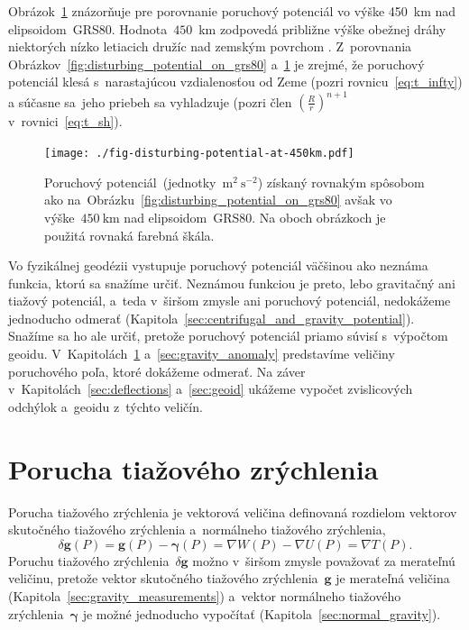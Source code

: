 \documentclass[a4paper,12pt]{book}
\let\vec\mathbf
\begin{document}
Obrázok~\ref{fig:disturbing_potential_at_450km} znázorňuje pre porovnanie 
poruchový potenciál vo výške 450~km nad elipsoidom~GRS80.  Hodnota~$450$~km 
zodpovedá približne výške obežnej dráhy niektorých nízko letiacich družíc nad 
zemským povrchom \parencite[pozri napríklad][]{MoritzPhysicalGeodesy}.  
Z~porovnania Obrázkov~\ref{fig:disturbing_potential_on_grs80} 
a~\ref{fig:disturbing_potential_at_450km} je zrejmé, že poruchový potenciál 
klesá s~narastajúcou vzdialenosťou od Zeme (pozri rovnicu~\ref{eq:t_infty}) 
a súčasne sa~jeho priebeh sa vyhladzuje (pozri člen $\left( \frac{R}{r} 
\right)^{n + 1}$ v~rovnici~\ref{eq:t_sh}).

\begin{figure}
\centering
\texttt{[image: ./fig-disturbing-potential-at-450km.pdf]}
\caption{Poruchový potenciál~(jednotky~$\mathrm{m}^2 \ \mathrm{s}^{-2}$) 
získaný rovnakým spôsobom ako 
na~Obrázku~\ref{fig:disturbing_potential_on_grs80} avšak vo výške~$450\ 
\mathrm{km}$ nad elipsoidom~GRS80.  Na oboch obrázkoch je použitá rovnaká 
farebná škála.}
\label{fig:disturbing_potential_at_450km}
\end{figure}

Vo fyzikálnej geodézii vystupuje poruchový potenciál väčšinou ako neznáma 
funkcia, ktorú sa snažíme určiť.  Neznámou funkciou je preto, lebo gravitačný 
ani tiažový potenciál, a~teda v~širšom zmysle ani poruchový potenciál, 
nedokážeme jednoducho odmerať 
(Kapitola~\ref{sec:centrifugal_and_gravity_potential}).  Snažíme sa ho ale 
určiť, pretože poruchový potenciál priamo súvisí s~výpočtom geoidu.  
V~Kapitolách~\ref{sec:gravity_disturbance} a~\ref{sec:gravity_anomaly} 
predstavíme veličiny poruchového poľa, ktoré dokážeme odmerať.  Na záver 
v~Kapitolách~\ref{sec:deflections} a~\ref{sec:geoid} ukážeme vypočet 
zvislicových odchýlok a~geoidu z~týchto veličín.





\section{Porucha tiažového zrýchlenia}
\label{sec:gravity_disturbance}

Porucha tiažového zrýchlenia je vektorová veličina definovaná rozdielom 
vektorov skutočného tiažového zrýchlenia a~normálneho tiažového zrýchlenia,
%
\begin{equation}
\label{eq:dg_vector}
\delta \vec g(P) = \vec g(P) - \boldsymbol \gamma(P) = \nabla W(P) - \nabla 
U(P) = \nabla T(P){.}
\end{equation}
%
Poruchu tiažového zrýchlenia~$\delta \vec g$ možno v~širšom zmysle považovať za 
merateľnú veličinu, pretože vektor skutočného tiažového zrýchlenia~$\vec g$ je 
merateľná veličina (Kapitola~\ref{sec:gravity_measurements}) a~vektor 
normálneho tiažového zrýchlenia~$\boldsymbol\gamma$ je možné jednoducho 
vypočítať (Kapitola~\ref{sec:normal_gravity}).
\end{document}
